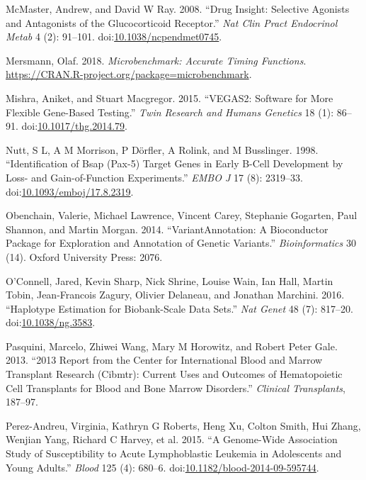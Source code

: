 \documentclass[]{DissertateOSU}
\begin{document}
\hypertarget{ref-McMaster_2008}{}
McMaster, Andrew, and David W Ray. 2008. ``Drug Insight: Selective
Agonists and Antagonists of the Glucocorticoid Receptor.'' \emph{Nat
Clin Pract Endocrinol Metab} 4 (2): 91--101.
doi:\href{https://doi.org/10.1038/ncpendmet0745}{10.1038/ncpendmet0745}.

\hypertarget{ref-microbenchmark}{}
Mersmann, Olaf. 2018. \emph{Microbenchmark: Accurate Timing Functions}.
\url{https://CRAN.R-project.org/package=microbenchmark}.

\hypertarget{ref-Mishra_2015}{}
Mishra, Aniket, and Stuart Macgregor. 2015. ``VEGAS2: Software for More
Flexible Gene-Based Testing.'' \emph{Twin Research and Humans Genetics}
18 (1): 86--91.
doi:\href{https://doi.org/10.1017/thg.2014.79}{10.1017/thg.2014.79}.

\hypertarget{ref-nutt_1998}{}
Nutt, S L, A M Morrison, P Dörfler, A Rolink, and M Busslinger. 1998.
``Identification of Bsap (Pax-5) Target Genes in Early B-Cell
Development by Loss- and Gain-of-Function Experiments.'' \emph{EMBO J}
17 (8): 2319--33.
doi:\href{https://doi.org/10.1093/emboj/17.8.2319}{10.1093/emboj/17.8.2319}.

\hypertarget{ref-variantannotation}{}
Obenchain, Valerie, Michael Lawrence, Vincent Carey, Stephanie Gogarten,
Paul Shannon, and Martin Morgan. 2014. ``VariantAnnotation: A
Bioconductor Package for Exploration and Annotation of Genetic
Variants.'' \emph{Bioinformatics} 30 (14). Oxford University Press:
2076.

\hypertarget{ref-OConnell_2016}{}
O'Connell, Jared, Kevin Sharp, Nick Shrine, Louise Wain, Ian Hall,
Martin Tobin, Jean-Francois Zagury, Olivier Delaneau, and Jonathan
Marchini. 2016. ``Haplotype Estimation for Biobank-Scale Data Sets.''
\emph{Nat Genet} 48 (7): 817--20.
doi:\href{https://doi.org/10.1038/ng.3583}{10.1038/ng.3583}.

\hypertarget{ref-Pasquini_2013}{}
Pasquini, Marcelo, Zhiwei Wang, Mary M Horowitz, and Robert Peter Gale.
2013. ``2013 Report from the Center for International Blood and Marrow
Transplant Research (Cibmtr): Current Uses and Outcomes of Hematopoietic
Cell Transplants for Blood and Bone Marrow Disorders.'' \emph{Clinical
Transplants}, 187--97.

\hypertarget{ref-PerezAndreu_2015}{}
Perez-Andreu, Virginia, Kathryn G Roberts, Heng Xu, Colton Smith, Hui
Zhang, Wenjian Yang, Richard C Harvey, et al. 2015. ``A Genome-Wide
Association Study of Susceptibility to Acute Lymphoblastic Leukemia in
Adolescents and Young Adults.'' \emph{Blood} 125 (4): 680--6.
doi:\href{https://doi.org/10.1182/blood-2014-09-595744}{10.1182/blood-2014-09-595744}.
\end{document}
